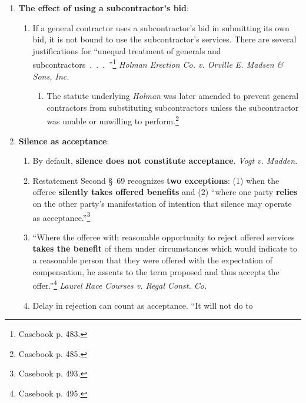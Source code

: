 \begin{enumerate}
\begin{enumerate}
        contractual terms. ``~.~.~.~when an offeree accepts the offeror's 
        services without expressing any objections to the offer's essential 
        terms, the offeree has manifested assent to those 
        terms.''\footnote{Casebook p. 478.} \emph{Polaroid Corp. v. Rollins 
        Environmental Services (NJ), Inc.}
    \end{enumerate}
    \item \textbf{The effect of using a subcontractor's bid}:
    \begin{enumerate}
        \item If a general contractor uses a subcontractor's bid in submitting 
        its own bid, it is not bound to use the subcontractor's services. 
        There are several justifications for ``unequal treatment of generals 
        and subcontractors~.~.~.~''\footnote{Casebook p. 483.} \emph{Holman 
        Erection Co. v. Orville E. Madsen \& Sons, Inc.}
        \begin{enumerate}
            \item The statute underlying \emph{Holman} was later amended to 
            prevent general contractors from substituting subcontractors 
            unless the subcontractor was unable or unwilling to 
            perform.\footnote{Casebook p.  485.}
        \end{enumerate}
    \end{enumerate}
    \item \textbf{Silence as acceptance}:
    \begin{enumerate}
        \item By default, \textbf{silence does not constitute acceptance}. 
        \emph{Vogt v. Madden}.
        \item Restatement Second \S\ 69 recognizes \textbf{two exceptions}: 
        (1) when the offeree \textbf{silently takes offered benefits} and (2) 
        ``where one party \textbf{relies} on the other party's manifestation 
        of intention that silence may operate as 
        acceptance.''\footnote{Casebook p. 493.}
        \item ``Where the offeree with reasonable opportunity to reject 
        offered services \textbf{takes the benefit} of them under 
        circumstances which would indicate to a reasonable person that they 
        were offered with the expectation of compensation, he assents to the 
        term proposed and thus accepts the offer.''\footnote{Casebook p. 495.} 
        \emph{Laurel Race Courses v. Regal Const. Co.}
        \item Delay in rejection can count as acceptance. ``It will not do to 

\end{enumerate}
\end{enumerate}

